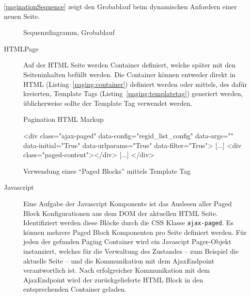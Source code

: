 \autoref{paginationSequence} zeigt den Grobablauf beim dynamischen Anfordern einer
neuen Seite.

\begin{figure}[H]	
	\centering
	
	\caption{Sequenzdiagramm, Grobablauf}
	\label{paginationSequence}
\end{figure}


\begin{description}
	\item[HTMLPage] Auf der HTML Seite werden Container definiert, welche später
	mit den Seiteninhalten befüllt werden. Die Container können entweder direkt in
	HTML (Listing~\ref{paging:container}) definiert werden oder mittels, des dafür
	kreierten, Template Tags (Listing~\ref{paging:templatetag}) generiert werden,
	üblicherweise sollte der Template Tag verwendet werden.
\begin{listing}[H]
\caption{Pagination HTML Markup}
\label{paging:container}
\begin{htmlcode}
<div class="ajax-paged"
  data-config="regid_list_config"
  data-args="{}"
  data-initial="True"
  data-urlparams="True"
  data-filter="True">
	[...]
	<div class="paged-content"></div>
	[...]
</div>
\end{htmlcode}
\end{listing}

\begin{listing}
\caption{Verwendung eines \enquote{Paged Blocks} mittels Template Tag}
\label{paging:templatetag}
\begin{pythoncode}
{%
\end{pythoncode}
\end{listing}

	\item[Javascript] Eine Aufgabe der Javascript Komponente ist das Auslesen aller
	Paged Block Konfigurationen aus dem DOM der aktuellen HTML Seite. Identifiziert
	werden diese Blöcke durch die CSS Klasse \texttt{ajax-paged}. Es können mehrere
	Paged Block Komponenten pro Seite definiert werden. Für jeden der gefunden
	Paging Container wird ein Javascipt Pager-Objekt instanziert, welches für die
	Verwaltung des Zustandes -- zum Beispiel die aktuelle Seite -- und die
	Kommunikation mit dem AjaxEndpoint verantwortlich ist. Nach erfolgreicher
	Kommunikation mit dem AjaxEndpoint wird der zurückgelieferte HTML Block in den
	entsprechenden Container geladen. 


\end{description}

